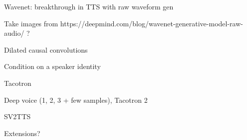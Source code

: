 \documentclass[a4paper, oneside]{article}
\begin{document}




\color{red}

Wavenet: breakthrough in TTS with raw waveform gen

Take images from https://deepmind.com/blog/wavenet-generative-model-raw-audio/ ?

Dilated causal convolutions

Condition on a speaker identity

Tacotron

Deep voice (1, 2, 3 + few samples), Tacotron 2

SV2TTS

Extensions?
\color{black}



\color{red}
\color{black}

\clearpage

 























\end{document}
